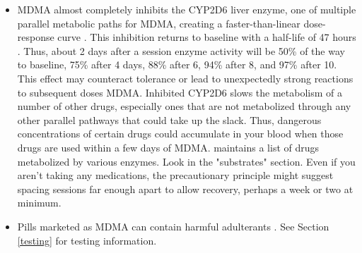 \documentclass[12pt,letterpaper]{book}
\begin{document}
\begin{itemize}
    \item MDMA almost completely inhibits the CYP2D6 liver enzyme, one of multiple parallel metabolic paths for MDMA, creating a faster-than-linear dose-response curve \cite{de2000nonlinear}. This inhibition returns to baseline with a half-life of 47 hours \cite{omathunaCYP}. Thus, about 2 days after a session enzyme activity will be 50\% of the way to baseline, 75\% after 4 days, 88\% after 6, 94\% after 8, and 97\% after 10. This effect may counteract tolerance or lead to unexpectedly strong reactions to subsequent doses MDMA. Inhibited CYP2D6 slows the metabolism of a number of other drugs, especially ones that are not metabolized through any other parallel pathways that could take up the slack. Thus, dangerous concentrations of certain drugs could accumulate in your blood when those drugs are used within a few days of MDMA. \textcite{flockartTable} maintains a list of drugs metabolized by various enzymes. Look in the "substrates" section. Even if you aren't taking any medications, the precautionary principle might suggest spacing sessions far enough apart to allow recovery, perhaps a week or two at minimum.
    \item Pills marketed as MDMA can contain harmful adulterants \cite{saleemiAdulterants}. See Section \ref{testing} for testing information.
\end{itemize}
\end{document}
